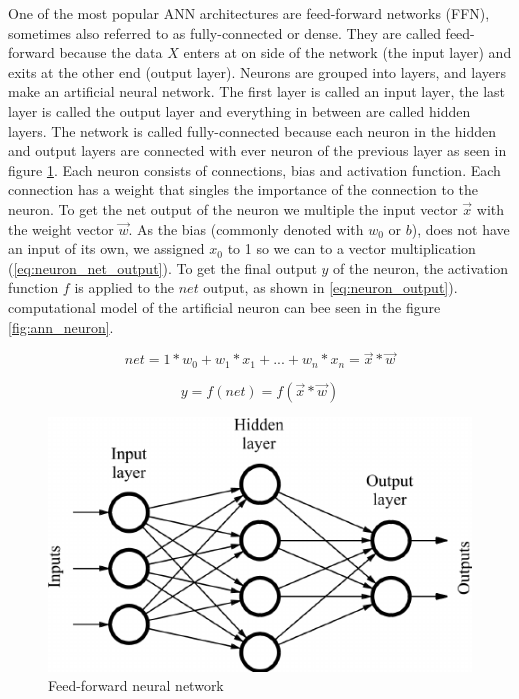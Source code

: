 \documentclass[times, utf8, diplomski]{fer}
\begin{document}
One of the most popular ANN architectures are feed-forward networks (FFN), sometimes also referred to as fully-connected or dense. They are called feed-forward because the data $X$ enters at on side of the network (the input layer) and exits at the other end (output layer). Neurons are grouped into layers, and layers make an artificial neural network. The first layer is called an input layer, the last layer is called the output layer and everything in between are called hidden layers. The network is called fully-connected because each neuron in the hidden and output layers are connected with ever neuron of the previous layer as seen in figure \ref{fig:ann}.
Each neuron consists of connections, bias and activation function. Each connection has a weight that singles the importance of the connection to the neuron. To get the net output of the neuron we multiple the input vector $\vec{x}$ with the weight vector $\vec{w}$. As the bias (commonly denoted with $w_0$ or $b$), does not have an input of its own, we assigned $x_0$ to 1 so we can to a vector multiplication (\ref{eq:neuron_net_output}). To get the final output $y$ of the neuron, the activation function $f$ is applied to the $net$ output, as shown in \ref{eq:neuron_output}). computational model of the artificial neuron can bee seen in the figure \ref{fig:ann_neuron}.

\begin{equation}
	\label{eq:neuron_net_output}
	net = 1*w_0 + w_1*x_1 + ... + w_n*x_n = \vec{x} * \vec{w}
\end{equation}

\begin{equation}
	\label{eq:neuron_output}
	y = f(net) = f(\vec{x}*\vec{w})
\end{equation}

\begin{figure}
  \includegraphics[width=\linewidth]{figures/ann.png}
  \caption{Feed-forward neural network}
  \label{fig:ann}
\end{figure}
\end{document}
